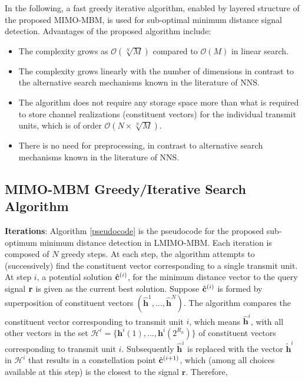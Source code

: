 In the following, a fast greedy iterative algorithm, enabled by layered structure of the proposed MIMO-MBM, is used for sub-optimal minimum distance signal detection. Advantages of the proposed algorithm include:

\begin{itemize}

\item The complexity grows as $\mathcal{O}( \sqrt[N]{M})$ compared to $\mathcal{O}(M)$ in linear search.

\item The complexity grows linearly with the number of dimensions in contrast to the alternative search mechanisms known in the literature of NNS.

\item The algorithm does not require any storage space more than what is required to store channel realizations (constituent vectors) for the individual transmit units, which is of order $\mathcal{O}( N \times \sqrt[N]{M})$.

\item There is no need for preprocessing, in contrast to alternative search mechanisms known in the literature of NNS.

\end{itemize}

\subsection{MIMO-MBM  Greedy/Iterative Search Algorithm}

\textbf{Iterations}: Algorithm \ref{pseudocode} is the pseudocode for the proposed sub-optimum minimum distance detection in LMIMO-MBM. Each iteration is composed of $N$ greedy steps. At each step, the algorithm attempts to (successively) find the constituent vector corresponding to a single transmit unit. At step $i$, a potential solution $\hat{ \mathbf{c} } ^ {(i)}$, for the minimum distance vector to the query signal $\mathbf{r}$ is given as the current best solution. Suppose $\hat{ \mathbf{c} } ^ {(i)}$ is formed by superposition of constituent vectors $(\hat{\mathbf{h}}^1, ..., \hat{\mathbf{h}}^N)$. The algorithm compares the constituent vector corresponding to transmit unit $i$, which means $\hat{\mathbf{h}}^{i}$, with all other vectors in the set $\mathcal{H}^{i} = \{ \mathbf{h}^{i}(1), ..., \mathbf{h}^{i}(2^{R_n}) \}$ of constituent vectors corresponding  to transmit unit $i$. Subsequently $\hat{\mathbf{h}}^{i}$ is replaced with the vector $\tilde{\mathbf{h}}^{i}$ in $\mathcal{H}^{i} $ that results in a constellation point $\hat{ \mathbf{c} } ^ {(i+1)}$, which (among all choices available at this step) is the closest to the signal $\mathbf{r}$. Therefore, 

